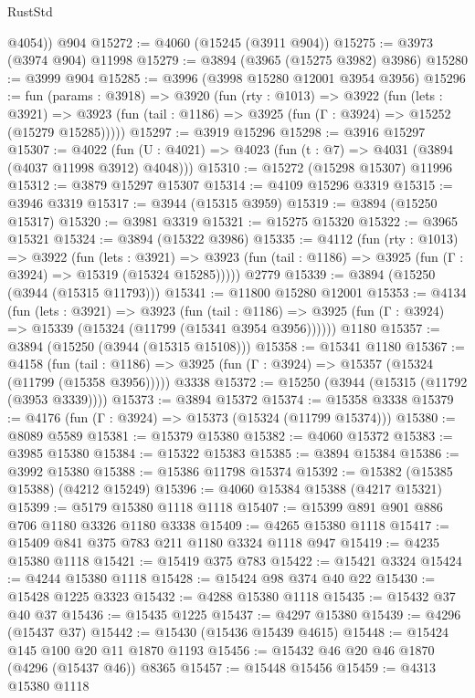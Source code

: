 \begin{lexlean}{RustStd}
\begin{coremodule}
        @4054))
    @904
@15272 := @4060 (@15245 (@3911 @904))
@15275 := @3973 (@3974 @904) @11998
@15279 := @3894 (@3965 (@15275 @3982) @3986)
@15280 := @3999 @904
@15285 := @3996 (@3998 @15280 @12001 @3954 @3956)
@15296 := fun (params : @3918) =>
  @3920
    (fun (rty : @1013) =>
    @3922
      (fun (lets : @3921) =>
      @3923 (fun (tail : @1186) => @3925 (fun (Γ : @3924) => @15252 (@15279 @15285)))))
@15297 := @3919 @15296
@15298 := @3916 @15297
@15307 := @4022
    (fun (U : @4021) => @4023 (fun (t : @7) => @4031 (@3894 (@4037 @11998 @3912) @4048)))
@15310 := @15272 (@15298 @15307) @11996
@15312 := @3879 @15297 @15307
@15314 := @4109 @15296 @3319
@15315 := @3946 @3319
@15317 := @3944 (@15315 @3959)
@15319 := @3894 (@15250 @15317)
@15320 := @3981 @3319
@15321 := @15275 @15320
@15322 := @3965 @15321
@15324 := @3894 (@15322 @3986)
@15335 := @4112
    (fun (rty : @1013) =>
    @3922
      (fun (lets : @3921) =>
      @3923 (fun (tail : @1186) => @3925 (fun (Γ : @3924) => @15319 (@15324 @15285)))))
    @2779
@15339 := @3894 (@15250 (@3944 (@15315 @11793)))
@15341 := @11800 @15280 @12001
@15353 := @4134
    (fun (lets : @3921) =>
    @3923
      (fun (tail : @1186) =>
      @3925 (fun (Γ : @3924) => @15339 (@15324 (@11799 (@15341 @3954 @3956))))))
    @1180
@15357 := @3894 (@15250 (@3944 (@15315 @15108)))
@15358 := @15341 @1180
@15367 := @4158
    (fun (tail : @1186) => @3925 (fun (Γ : @3924) => @15357 (@15324 (@11799 (@15358 @3956)))))
    @3338
@15372 := @15250 (@3944 (@15315 (@11792 (@3953 @3339))))
@15373 := @3894 @15372
@15374 := @15358 @3338
@15379 := @4176 (fun (Γ : @3924) => @15373 (@15324 (@11799 @15374)))
@15380 := @8089 @5589
@15381 := @15379 @15380
@15382 := @4060 @15372
@15383 := @3985 @15380
@15384 := @15322 @15383
@15385 := @3894 @15384
@15386 := @3992 @15380
@15388 := @15386 @11798 @15374
@15392 := @15382 (@15385 @15388) (@4212 @15249)
@15396 := @4060 @15384 @15388 (@4217 @15321)
@15399 := @5179 @15380 @1118 @1118
@15407 := @15399 @891 @901 @886 @706 @1180 @3326 @1180 @3338
@15409 := @4265 @15380 @1118
@15417 := @15409 @841 @375 @783 @211 @1180 @3324 @1118 @947
@15419 := @4235 @15380 @1118
@15421 := @15419 @375 @783
@15422 := @15421 @3324
@15424 := @4244 @15380 @1118
@15428 := @15424 @98 @374 @40 @22
@15430 := @15428 @1225 @3323
@15432 := @4288 @15380 @1118
@15435 := @15432 @37 @40 @37
@15436 := @15435 @1225
@15437 := @4297 @15380
@15439 := @4296 (@15437 @37)
@15442 := @15430 (@15436 @15439 @4615)
@15448 := @15424 @145 @100 @20 @11 @1870 @1193
@15456 := @15432 @46 @20 @46 @1870 (@4296 (@15437 @46)) @8365
@15457 := @15448 @15456
@15459 := @4313 @15380 @1118

\end{coremodule}
\end{lexlean}
